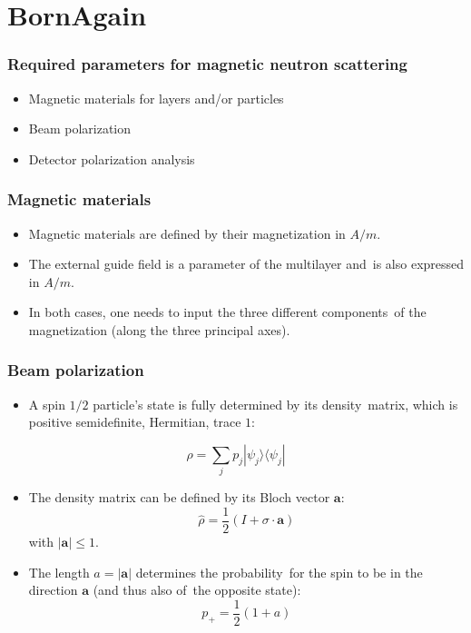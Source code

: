 \documentclass{beamer}
\begin{document}
\section{BornAgain}

\begin{frame}
    \frametitle{Required parameters for magnetic neutron scattering}
    \begin{itemize}
        \item Magnetic materials for layers and/or particles
        \item Beam polarization
        \item Detector polarization analysis
    \end{itemize}
\end{frame}

\begin{frame}
    \frametitle{Magnetic materials}
    \begin{itemize}
        \item Magnetic materials are defined by their magnetization in $A/m$.
        \item The external guide field is a parameter of the multilayer and\
              is also expressed in $A/m$.
        \item In both cases, one needs to input the three different components\
              of the magnetization (along the three principal axes).
    \end{itemize}
\end{frame}

\begin{frame}
    \frametitle{Beam polarization}
    \begin{itemize}
        \item A spin $1/2$ particle's state is fully determined by its density\
              matrix, which is positive semidefinite, Hermitian, trace $1$:
    \end{itemize}
    \[ \hat\rho = \sum_j p_j \left| \psi_j \rangle\langle \psi_j \right| \]
    \begin{itemize}
        \item The density matrix can be defined by its Bloch vector $\mathbf a$:
        \[ \hat\rho = \frac{1}{2}\left( I + \sigma\cdot\mathbf a \right) \]
              with $|\mathbf a| \leq 1$.
        \item The length $a=\left| \mathbf a \right|$ determines the probability\
              for the spin to be in the direction $\mathbf a$ (and thus also of\
              the opposite state):
        \[ p_+ = \frac{1}{2}\left( 1 + a \right) \]
    \end{itemize}
    
\end{frame}
\end{document}
